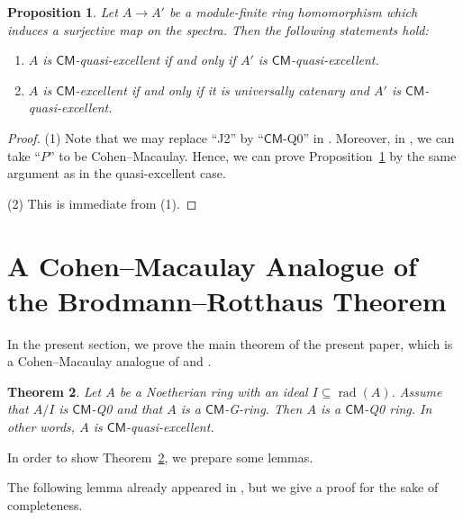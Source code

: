 \documentclass[a4paper, 11pt]{amsart}
\newtheorem{theorem}{Theorem}[section]
\newtheorem{proposition}[theorem]{Proposition}
\theoremstyle{definition}
\newcommand{\rad}{\operatorname{rad}}
\let\subset\subseteq
\begin{document}
\begin{proposition}\label{prop:greco}
    Let $A \to A'$ be a module-finite ring homomorphism which induces a surjective map on the spectra. Then the following statements hold:
    \begin{enumerate}
        \item $A$ is $\mathsf{CM}$-quasi-excellent if and only if $A'$ is $\mathsf{CM}$-quasi-excellent. 
        \item $A$ is $\mathsf{CM}$-excellent if and only if it is universally catenary and $A'$ is $\mathsf{CM}$-quasi-excellent.
    \end{enumerate}
\end{proposition}
\begin{proof}
    (1) Note that we may replace ``J2'' by ``$\mathsf{CM}$-Q0'' in \cite[Proposition 2.4]{Gre76}. Moreover, in \cite[Proposition~1.3]{Gre76}, we can take ``$P$'' to be Cohen--Macaulay. Hence, we can prove Proposition~\ref{prop:greco} by the same argument as in the quasi-excellent case.

    (2) This is immediate from (1). 
\end{proof}

\section{A Cohen--Macaulay Analogue of the Brodmann--Rotthaus Theorem}\label{sec:CM-version}

In the present section, we prove the main theorem of the present paper, which is a Cohen--Macaulay analogue of \cite[Theorem~2]{BR80} and \cite[Theorem~4.1]{KS21}.

\begin{theorem}\label{thm:main1}
    Let $A$ be a Noetherian ring with an ideal $I \subset \rad(A)$. Assume that $A/I$ is $\mathsf{CM}$\textup{-Q0} and that $A$ is a $\mathsf{CM}$\textnormal{-G-}ring. Then $A$ is a $\mathsf{CM}$\textnormal{-Q0} ring. In other words, $A$ is $\mathsf{CM}$-quasi-excellent.
\end{theorem}

In order to show Theorem~\ref{thm:main1}, we prepare some lemmas. 

The following lemma already appeared in \cite[Lemma 2.1]{Tak07}, but we give a proof for the sake of completeness.
\end{document}
